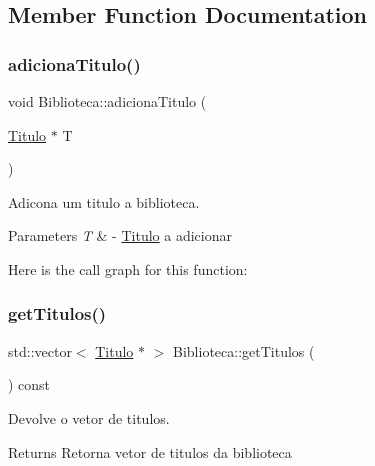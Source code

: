 \subsection{Member Function Documentation}
\mbox{\label{class_biblioteca_af10c9f23d85db8e03ae2e8b9d3e593e1}} 
\subsubsection{\texorpdfstring{adiciona\+Titulo()}{adicionaTitulo()}}
{\footnotesize\ttfamily void Biblioteca\+::adiciona\+Titulo (\begin{DoxyParamCaption}\item[{\mbox{\hyperlink{class_titulo}{Titulo}} $\ast$}]{T }\end{DoxyParamCaption})}



Adicona um titulo a biblioteca. 


\begin{DoxyParams}{Parameters}
{\em T} & -\/ \mbox{\hyperlink{class_titulo}{Titulo}} a adicionar \\
\hline
\end{DoxyParams}
Here is the call graph for this function\+:
\mbox{\label{class_biblioteca_a03c1ebf76a4ace4f57000bb99a87bb88}} 
\subsubsection{\texorpdfstring{get\+Titulos()}{getTitulos()}}
{\footnotesize\ttfamily std\+::vector$<$ \mbox{\hyperlink{class_titulo}{Titulo}} $\ast$ $>$ Biblioteca\+::get\+Titulos (\begin{DoxyParamCaption}{ }\end{DoxyParamCaption}) const}



Devolve o vetor de titulos. 

\begin{DoxyReturn}{Returns}
Retorna vetor de titulos da biblioteca 
\end{DoxyReturn}
\mbox{\label{class_biblioteca_a962423a2d93507ad7348e9b8c83eb1b8}} 
